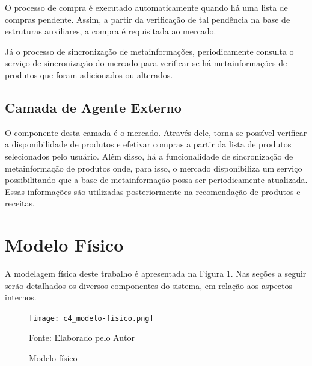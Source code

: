 O processo de compra é executado automaticamente quando há uma lista de compras pendente. Assim, a partir da verificação de tal pendência na base de estruturas auxiliares, a compra é requisitada ao mercado. 

Já o processo de sincronização de metainformações, periodicamente consulta o serviço de sincronização do mercado para verificar se há metainformações de produtos que foram adicionados ou alterados.

\subsection{Camada de Agente Externo}

O componente desta camada é o mercado. Através dele, torna-se possível verificar a disponibilidade de produtos e efetivar compras a partir da lista de produtos selecionados pelo usuário. Além disso, há a funcionalidade de sincronização de metainformação de produtos onde, para isso, o mercado disponibiliza um serviço possibilitando que a base de metainformação possa ser periodicamente atualizada. Essas informações são utilizadas posteriormente na recomendação de produtos e receitas.



\section{Modelo F\'isico}


A modelagem física deste trabalho é apresentada na Figura \ref{fig:c4_modelo_fisico}. Nas seções a seguir serão detalhados os diversos componentes do sistema, em relação aos aspectos internos.


\begin{figure}[H]
    \caption{Modelo físico}
    \label{fig:c4_modelo_fisico}
    \texttt{[image: c4\_modelo-fisico.png]}
    
    \footnotesize{Fonte: Elaborado pelo Autor}
\end{figure}

